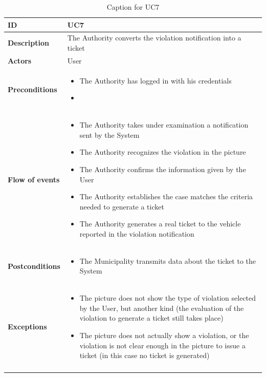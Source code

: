 \documentclass {article}
\begin{document}
			
					\begin{longtable}{| p{3 cm} | p{8.5 cm} |} 
			\hline
			{\bf ID} & UC7 \\
			\hline
			{\bf Description} & The Authority converts the violation notification into a ticket \\
			\hline
			{\bf Actors} & User\\
			\hline
			{\bf Preconditions} & \begin{itemize}
								  \item The Authority has logged in with his credentials
								  \item
								  \end{itemize}	\\
			\hline
			{\bf Flow of events} &	\begin{itemize}
								  \item The Authority takes under examination a notification sent by the System
								  \item The Authority recognizes the violation in the picture
								  \item The Authority confirms the information given by the User
								  \item The Authority establishes the case matches the criteria needed to generate a ticket
								  \item The Authority generates a real ticket to the vehicle reported in the violation notification
								  \end{itemize}	\\
			\hline
			{\bf Postconditions} & \begin{itemize}
								  \item The Municipality transmits data about the ticket to the System
								  \end{itemize}	 \\
			\hline
			{\bf Exceptions} & 	\begin{itemize}
								  \item The picture does not show the type of violation selected by the User, but another kind (the evaluation of the violation to generate a ticket still takes place)
								  \item The picture does not actually show a violation, or the violation is not clear enough in the picture to issue a ticket (in this case no ticket is generated)
								  \end{itemize}	\\
			\hline
			\caption{Caption for UC7}
			\end{longtable}
			
\end{document}
